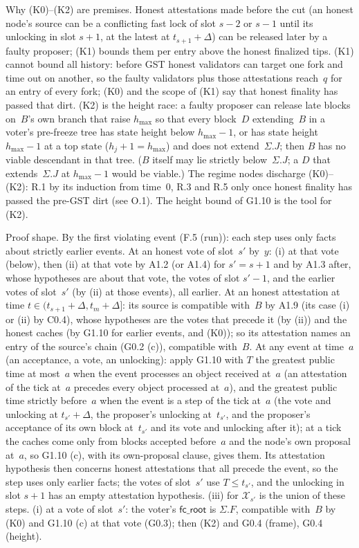 \documentclass{article}
\newcommand{\hmax}{h_{\max}}
\newcommand{\fcroot}{\mathsf{fc\_root}}
\begin{document}
{Why (K0)--(K2) are premises.  Honest attestations made before the cut (an
honest node's source can be a conflicting fast lock of slot $s-2$ or $s-1$
until its unlocking in slot $s+1$, at the latest at $t_{s+1}+\Delta$) can be
released later by a faulty proposer; (K1) bounds them per entry above the
honest finalized tips.  (K1) cannot bound all history: before GST honest
validators can target one fork and time out on another, so the faulty
validators plus those attestations reach~$q$ for an entry of every fork; (K0) and the
scope of (K1) say that honest finality has passed that dirt.  (K2) is the
height race: a faulty proposer can release late blocks on~$B$'s own branch
that raise $\hmax$ so that every block~$D$ extending~$B$ in a voter's
pre-freeze tree has state height below $\hmax-1$, or has state height
$\hmax-1$ at a top state ($h_j+1=\hmax$) and does not extend~$\Sigma.J$;
then $B$ has no viable descendant in that tree.  ($B$ itself may lie strictly
below~$\Sigma.J$; a $D$ that extends~$\Sigma.J$ at $\hmax-1$ would be viable.)
The regime nodes discharge (K0)--(K2): R.1 by its induction from time~$0$, R.3 and
R.5 only once honest finality has passed the pre-GST dirt (see O.1).  The
height bound of G1.10 is the tool for (K2).

Proof shape.  By the first violating event (F.5 (run)): each step uses only facts
about strictly earlier events.  At an honest vote of slot~$s'$ by~$y$: (i) at
that vote (below), then (ii) at that vote by A1.2 (or A1.4) for $s'=s+1$ and by
A1.3 after, whose hypotheses are about that vote, the votes of slot $s'-1$, and
the earlier votes of slot~$s'$ (by (ii) at those events), all earlier.  At an honest attestation at time
$t\in(t_{s+1}+\Delta,t_m+\Delta]$: its source is compatible with~$B$ by A1.9
(its case (i) or (ii) by C0.4), whose hypotheses are the votes that precede it (by (ii)) and the honest
caches (by G1.10 for earlier events, and (K0)); so its attestation names an entry of
the source's chain (G0.2 (c)), compatible with~$B$.  At any event at time~$a$
(an acceptance, a vote, an unlocking): apply G1.10 with $T$ the greatest
public time at most~$a$ when the event processes an object received at~$a$
(an attestation of the tick at~$a$ precedes every object processed at~$a$), and the
greatest public time strictly before~$a$ when the event is a step of the tick
at~$a$ (the vote and unlocking at $t_{s'}+\Delta$, the proposer's unlocking
at~$t_{s'}$, and the proposer's acceptance of its own block at~$t_{s'}$ and
its vote and unlocking after it); at a tick the caches come only from blocks
accepted before~$a$ and the node's own proposal at~$a$, so G1.10 (c), with its
own-proposal clause, gives them.  Its attestation hypothesis then concerns honest
attestations that all precede the event, so the step uses only earlier facts; the
votes of slot~$s'$ use $T\leq t_{s'}$, and the unlocking in slot $s+1$ has an
empty attestation hypothesis.  (iii) for $\mathcal X_{s'}$ is the union
of these steps.  (i) at a vote of slot~$s'$:
the voter's $\fcroot$ is $\Sigma.F$, compatible with~$B$ by (K0) and G1.10 (c)
at that vote (G0.3); then (K2) and G0.4 (frame), G0.4 (height).}
\end{document}
